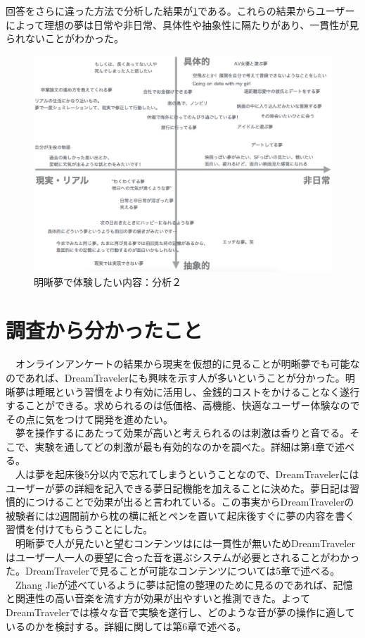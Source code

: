 回答をさらに違った方法で分析した結果が\ref{desiredDreamTpye2}である。これらの結果からユーザーによって理想の夢は日常や非日常、具体性や抽象性に隔たりがあり、一貫性が見られないことがわかった。
\begin{figure}[htbp]
\begin{center}
\includegraphics[width=13cm]{eps/whatYouWantToDream.eps}
\caption{明晰夢で体験したい内容：分析２}
\label{desiredDreamTpye2}
\end{center}
\end{figure}

\section{調査から分かったこと}
　オンラインアンケートの結果から現実を仮想的に見ることが明晰夢でも可能なのであれば、DreamTravelerにも興味を示す人が多いということが分かった。明晰夢は睡眠という習慣をより有効に活用し、金銭的コストをかけることなく遂行することができる。求められるのは低価格、高機能、快適なユーザー体験なのでその点に気をつけて開発を進めたい。\\
　夢を操作するにあたって効果が高いと考えられるのは刺激は香りと音でる。そこで、実験を通してどの刺激が最も有効的なのかを調べた。詳細は第4章で述べる。\\
　人は夢を起床後5分以内で忘れてしまうということなので、DreamTravelerにはユーザーが夢の詳細を記入できる夢日記機能を加えることに決めた。夢日記は習慣的につけることで効果が出ると言われている。この事実からDreamTravelerの被験者には2週間前から枕の横に紙とペンを置いて起床後すぐに夢の内容を書く習慣を付けてもらうことにした。\\
　明晰夢で人が見たいと望むコンテンツはには一貫性が無いためDreamTravelerはユーザ一人一人の要望に合った音を選ぶシステムが必要とされることがわかった。DreamTravelerで見ることが可能なコンテンツについては5章で述べる。\\
　Zhang Jieが述べているように夢は記憶の整理のために見るのであれば\cite{Zhang}、記憶と関連性の高い音楽を流す方が効果が出やすいと推測できた。よってDreamTravelerでは様々な音で実験を遂行し、どのような音が夢の操作に適しているのかを検討する。詳細に関しては第6章で述べる。
　
　
